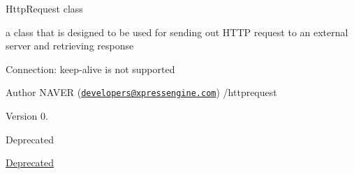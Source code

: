 \begin{DoxyItemize}
\item Http\+Request class
\item a class that is designed to be used for sending out H\+T\+T\+P request to an external server and retrieving response
\item Connection\+: keep-\/alive is not supported \begin{DoxyAuthor}{Author}
N\+A\+V\+E\+R (\href{mailto:developers@xpressengine.com}{\tt developers@xpressengine.\+com}) /httprequest 
\end{DoxyAuthor}
\begin{DoxyVersion}{Version}
0. 
\end{DoxyVersion}
\begin{DoxyRefDesc}{Deprecated}
\item[\hyperlink{deprecated__deprecated000010}{Deprecated}]\end{DoxyRefDesc}


\end{DoxyItemize}
